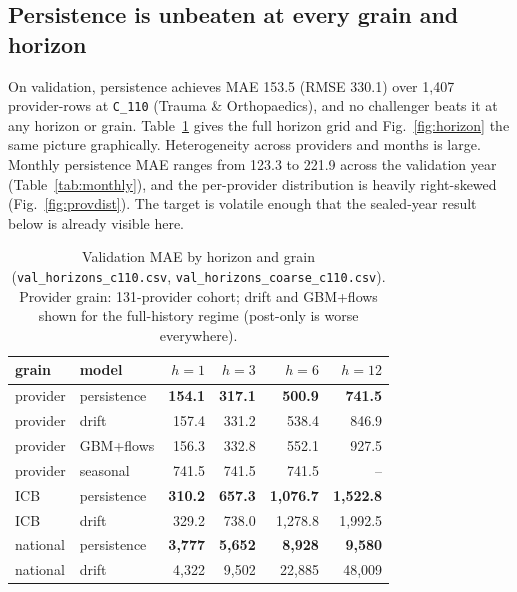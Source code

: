 \documentclass[conference]{IEEEtran}
\begin{document}
\subsection{Persistence is unbeaten at every grain and horizon}
On validation, persistence achieves MAE 153.5 (RMSE 330.1) over 1{,}407 provider-rows at
\texttt{C\_110} (Trauma \& Orthopaedics), and no challenger beats it at any horizon or grain.
Table~\ref{tab:horizons} gives the full horizon grid and Fig.~\ref{fig:horizon} the same picture
graphically. Heterogeneity across providers and months is large. Monthly persistence MAE ranges
from 123.3 to 221.9 across the validation year (Table~\ref{tab:monthly}), and the per-provider
distribution is heavily right-skewed (Fig.~\ref{fig:provdist}). The target is volatile enough that
the sealed-year result below is already visible here.

\begin{table}[t]
\caption{Validation MAE by horizon and grain (\texttt{val\_horizons\_c110.csv},
\texttt{val\_horizons\_coarse\_c110.csv}). Provider grain: 131-provider cohort; drift and
GBM+flows shown for the full-history regime (post-only is worse everywhere).}
\label{tab:horizons}
\centering
\begin{tabular}{llrrrr}
\toprule
grain & model & $h{=}1$ & $h{=}3$ & $h{=}6$ & $h{=}12$ \\
\midrule
provider & persistence & \textbf{154.1} & \textbf{317.1} & \textbf{500.9} & \textbf{741.5} \\
provider & drift & 157.4 & 331.2 & 538.4 & 846.9 \\
provider & GBM+flows & 156.3 & 332.8 & 552.1 & 927.5 \\
provider & seasonal & 741.5 & 741.5 & 741.5 & -- \\
\midrule
ICB & persistence & \textbf{310.2} & \textbf{657.3} & \textbf{1{,}076.7} & \textbf{1{,}522.8} \\
ICB & drift & 329.2 & 738.0 & 1{,}278.8 & 1{,}992.5 \\
national & persistence & \textbf{3{,}777} & \textbf{5{,}652} & \textbf{8{,}928} & \textbf{9{,}580} \\
national & drift & 4{,}322 & 9{,}502 & 22{,}885 & 48{,}009 \\
\bottomrule
\end{tabular}
\end{table}
\end{document}
